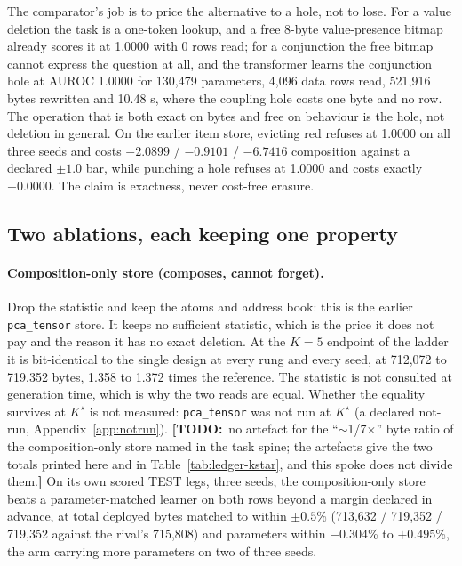 \documentclass{article} %
\newcommand{\TODO}[1]{{\color{orange}\textbf{[TODO:}~#1\textbf{]}}}
\newcommand{\Kstar}{\ensuremath{K^{\star}}}
\begin{document}
\noindent The comparator's job is to price the alternative to a hole, not to lose. For a value
deletion the task is a one-token lookup, and a free 8-byte value-presence bitmap already scores
it at 1.0000 with 0 rows read; for a conjunction the free bitmap cannot express the question at
all, and the transformer learns the conjunction hole at AUROC 1.0000 for 130,479 parameters,
4,096 data rows read, 521,916 bytes rewritten and 10.48 s, where the coupling hole costs one
byte and no row. %
\noindent The operation that is both exact on bytes and free on behaviour is the hole, not
deletion in general. On the earlier item store, evicting red refuses at 1.0000 on all three
seeds and costs $-2.0899$ / $-0.9101$ / $-6.7416$ composition against a declared $\pm1.0$ bar,
while punching a hole refuses at 1.0000 and costs exactly $+0.0000$. %
The claim is exactness, never cost-free erasure.

\subsection{Two ablations, each keeping one property}
\label{sec:ablations}

\paragraph{Composition-only store (composes, cannot forget).} Drop the statistic and keep the
atoms and address book: this is the earlier \texttt{pca\_tensor} store. It keeps no sufficient
statistic, which is the price it does not pay and the reason it has no exact deletion. At the
$K=5$ endpoint of the ladder it is bit-identical to the single design at every rung and every
seed, at 712,072 to 719,352 bytes, 1.358 to 1.372 times the reference.
The statistic is not consulted at generation time, which is why the two reads are equal.
Whether the equality survives at $\Kstar$ is not measured: \texttt{pca\_tensor} was not run at
$\Kstar$ (a declared not-run, Appendix~\ref{app:notrun}). \TODO{no artefact for the
``$\sim$1/7$\times$'' byte ratio of the composition-only store named in the task spine; the
artefacts give the two totals printed here and in Table~\ref{tab:ledger-kstar}, and this spoke
does not divide them.}
On its own scored TEST legs, three seeds, the composition-only store beats a parameter-matched
learner on both rows beyond a margin declared in advance, at total deployed bytes matched to
within $\pm0.5$\% (713,632 / 719,352 / 719,352 against the rival's 715,808) and parameters within
$-0.304$\% to $+0.495$\%, the arm carrying more parameters on two of three seeds.
\end{document}
